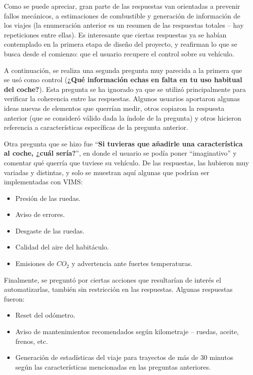 Como se puede apreciar, gran parte de las respuestas van orientadas a prevenir fallos
mecánicos, a estimaciones de combustible y generación de información de los viajes
(la enumeración anterior es un resumen de las respuestas totales -- hay repeticiones
entre ellas). Es interesante que ciertas respuestas ya se habían contemplado en
la primera etapa de diseño del proyecto, y reafirman lo que se busca desde el
comienzo: que el usuario recupere el control sobre su vehículo.

A continuación, se realiza una segunda pregunta muy parecida a la primera que se usó
como control (\textbf{¿Qué información echas en falta en tu uso habitual del coche?}).
Esta pregunta se ha ignorado ya que se utilizó principalmente para verificar la
coherencia entre las respuestas. Algunos usuarios aportaron algunas ideas nuevas
de elementos que querrían medir, otros copiaron la respuesta anterior (que se
consideró válido dada la índole de la pregunta) y otros hicieron referencia a
características específicas de la pregunta anterior.

Otra pregunta que se hizo fue ``\textbf{Si tuvieras que añadirle una característica al
coche, ¿cuál sería?}'', en donde el usuario se podía poner ``imaginativo'' y comentar
qué querría que tuviese su vehículo. De las respuestas, las hubieron muy variadas
y distintas, y solo se muestran aquí algunas que podrían ser implementadas con
\ac{VIMS}:

\begin{itemize}
  \item Presión de las ruedas.
  \item Aviso de errores.
  \item Desgaste de las ruedas.
  \item Calidad del aire del habitáculo.
  \item Emisiones de $CO_2$ y advertencia ante fuertes temperaturas.
\end{itemize}

Finalmente, se preguntó por ciertas acciones que resultarían de interés el
automatizarlas, también sin restricción en las respuestas. Algunas respuestas
fueron:

\begin{itemize}
  \item Reset del odómetro.
  \item Aviso de mantenimientos recomendados según kilometraje -- ruedas, aceite, frenos, etc.
  \item Generación de estadísticas del viaje para trayectos de más de 30 minutos según
        las características mencionadas en las preguntas anteriores.
\end{itemize}

